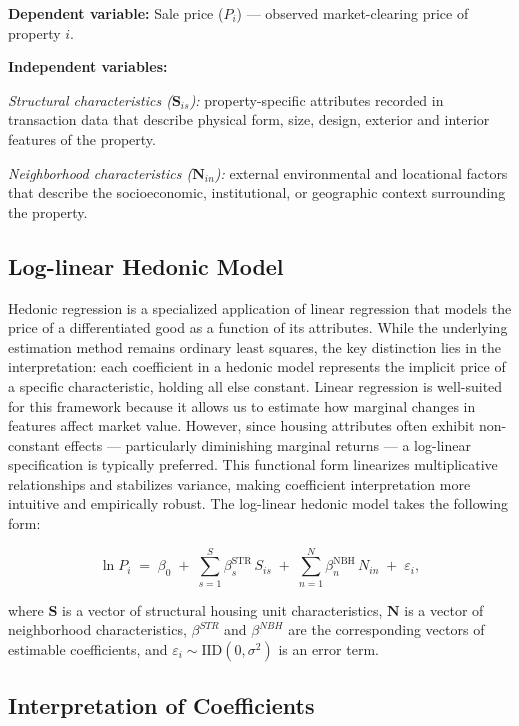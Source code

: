 \documentclass[11pt]{article}
\begin{document}
\textbf{Dependent variable:} Sale price ($P_i$) --- observed market-clearing price of property $i$.

\textbf{Independent variables:}

\textit{Structural characteristics ($\mathbf S_{is}$):} property-specific attributes recorded in transaction data that describe physical form, size, design, exterior and interior features of the property.

\textit{Neighborhood characteristics ($\mathbf N_{in}$):} external environmental and locational factors that describe the socioeconomic, institutional, or geographic context surrounding the property.


\subsection{Log-linear Hedonic Model}

Hedonic regression is a specialized application of linear regression that models the price of a differentiated good as a function of its attributes. While the underlying estimation method remains ordinary least squares, the key distinction lies in the interpretation: each coefficient in a hedonic model represents the implicit price of a specific characteristic, holding all else constant. Linear regression is well-suited for this framework because it allows us to estimate how marginal changes in features affect market value. However, since housing attributes often exhibit non-constant effects --- particularly diminishing marginal returns --- a log-linear specification is typically preferred. This functional form linearizes multiplicative relationships and stabilizes variance, making coefficient interpretation more intuitive and empirically robust. The log-linear hedonic model takes the following form:

\[
\ln P_i \;=\;
\beta_0
\;+\;
\sum_{s=1}^{S}\beta_{s}^{\text{STR}}\, S_{is}
\;+\;
\sum_{n=1}^{N}\beta_{n}^{\text{NBH}}\, N_{in}
\;+\;
\varepsilon_i,
\]

where $\mathbf S $ is a vector of structural housing unit characteristics, $\mathbf N $ is a vector of neighborhood characteristics, $\beta^{STR}$ and $\beta^{NBH}$ are the corresponding vectors of estimable coefficients, and $\varepsilon_i \sim \text{IID}(0,\sigma^{2})$ is an error term.


\subsection{Interpretation of Coefficients}
\end{document}

